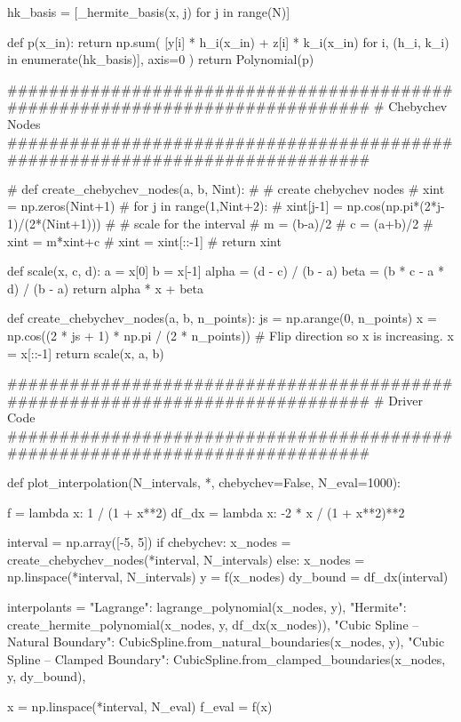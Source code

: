 \documentclass{homework}
\begin{document}
\begin{python}
    hk_basis = [_hermite_basis(x, j) for j in range(N)]

    def p(x_in):
        return np.sum(
            [y[i] * h_i(x_in) + z[i] * k_i(x_in)
             for i, (h_i, k_i) in enumerate(hk_basis)],
            axis=0
        )
    return Polynomial(p)


##############################################################################
# Chebychev Nodes
##############################################################################


# def create_chebychev_nodes(a, b, Nint):
#     # create chebychev nodes
#     xint = np.zeros(Nint+1)
#     for j in range(1,Nint+2):
#         xint[j-1] = np.cos(np.pi*(2*j-1)/(2*(Nint+1)))
#         # scale  for the interval
#         m = (b-a)/2
#         c = (a+b)/2
#         xint = m*xint+c
#         xint = xint[::-1]
#     return xint

def scale(x, c, d):
    a = x[0]
    b = x[-1]
    alpha = (d - c) / (b - a)
    beta = (b * c - a * d) / (b - a)
    return alpha * x + beta


def create_chebychev_nodes(a, b, n_points):
    js = np.arange(0, n_points)
    x = np.cos((2 * js + 1) * np.pi / (2 * n_points))
    # Flip direction so x is increasing.
    x = x[::-1]
    return scale(x, a, b)



##############################################################################
# Driver Code
##############################################################################



def plot_interpolation(N_intervals, *, chebychev=False, N_eval=1000):

    f = lambda x: 1 / (1 + x**2)
    df_dx = lambda x: -2 * x / (1 + x**2)**2

    interval = np.array([-5, 5])
    if chebychev:
        x_nodes = create_chebychev_nodes(*interval, N_intervals)
    else:
        x_nodes = np.linspace(*interval, N_intervals)
    y = f(x_nodes)
    dy_bound = df_dx(interval)

    interpolants = {
        "Lagrange": lagrange_polynomial(x_nodes, y),
        "Hermite": create_hermite_polynomial(x_nodes, y, df_dx(x_nodes)),
        "Cubic Spline -- Natural Boundary":
            CubicSpline.from_natural_boundaries(x_nodes, y),
        "Cubic Spline -- Clamped Boundary":
            CubicSpline.from_clamped_boundaries(x_nodes, y, dy_bound),
    }

    x = np.linspace(*interval, N_eval)
    f_eval = f(x)


\end{python}
\end{document}

